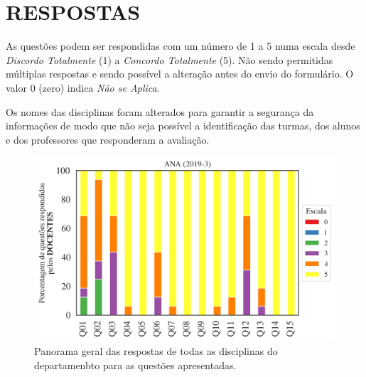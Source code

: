 \documentclass[a4paper,10pt]{article}
\begin{document}
\section{RESPOSTAS}
As questões podem ser respondidas com um número de 1 a 5 numa escala desde {\it Discordo Totalmente} (1) a {\it Concordo Totalmente} (5). Não sendo permitidas múltiplas respostas e sendo possível a alteração antes do envio do formulário. O valor 0 (zero) indica {\it Não se Aplica}.

Os nomes das disciplinas foram alterados para garantir a segurança da informações de modo que não seja possível a identificação das turmas, dos alunos  e dos professores que responderam a avaliação.

\begin{figure}[h]
\centering
\includegraphics[width=0.85\linewidth]{analise_geral_departamento_ANA_docentes.png}
\caption{\label{fig:analise_geral_departamento}            Panorama geral das respostas de todas as  disciplinas do departamenbto para as questões apresentadas.}
\end{figure}
\end{document}

